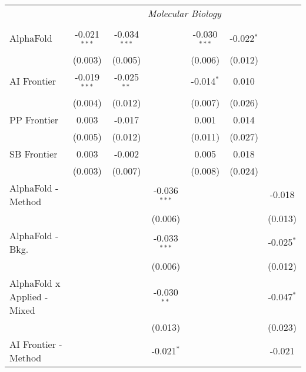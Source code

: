 \begin{tabular}{lcccccc}
 & \multicolumn{6}{c}{\textit{Molecular Biology}} \\ \\
   AlphaFold                     & -0.021$^{***}$ & -0.034$^{***}$ &                & -0.030$^{***}$ & -0.022$^{*}$ &   \\   
                                 & (0.003)        & (0.005)        &                & (0.006)        & (0.012)      &   \\   
   AI Frontier                   & -0.019$^{***}$ & -0.025$^{**}$  &                & -0.014$^{*}$   & 0.010        &   \\   
                                 & (0.004)        & (0.012)        &                & (0.007)        & (0.026)      &   \\   
   PP Frontier                   & 0.003          & -0.017         &                & 0.001          & 0.014        &   \\   
                                 & (0.005)        & (0.012)        &                & (0.011)        & (0.027)      &   \\   
   SB Frontier                   & 0.003          & -0.002         &                & 0.005          & 0.018        &   \\   
                                 & (0.003)        & (0.007)        &                & (0.008)        & (0.024)      &   \\   
   AlphaFold - Method            &                &                & -0.036$^{***}$ &                &              & -0.018\\   
                                 &                &                & (0.006)        &                &              & (0.013)\\   
   AlphaFold - Bkg.              &                &                & -0.033$^{***}$ &                &              & -0.025$^{*}$\\   
                                 &                &                & (0.006)        &                &              & (0.012)\\   
   AlphaFold x Applied - Mixed   &                &                & -0.030$^{**}$  &                &              & -0.047$^{*}$\\   
                                 &                &                & (0.013)        &                &              & (0.023)\\   
   AI Frontier - Method          &                &                & -0.021$^{*}$   &                &              & -0.021\\   

\end{tabular}
